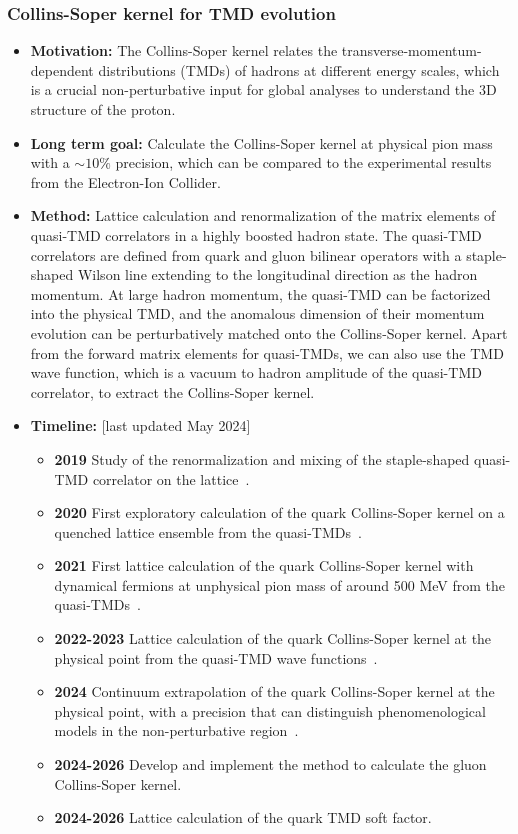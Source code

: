 \documentclass[12pt,hyperpdf]{article}
\begin{document}
\subsubsection{Collins-Soper kernel for TMD evolution}
\begin{itemize}
    \item{\bf Motivation:} The Collins-Soper kernel relates the
      transverse-momentum-dependent distributions (TMDs) of hadrons at
      different energy scales, which is a crucial non-perturbative
      input for global analyses to understand the 3D structure of the
      proton.
    \item{\bf Long term goal:} Calculate the Collins-Soper kernel at
      physical pion mass with a $\sim 10\%$ precision, which can be
      compared to the experimental results from the Electron-Ion
      Collider.
    \item{\bf Method:} Lattice calculation and renormalization of the
      matrix elements of quasi-TMD correlators in a highly boosted
      hadron state. The quasi-TMD correlators are defined from quark
      and gluon bilinear operators with a staple-shaped Wilson line
      extending to the longitudinal direction as the hadron
      momentum. At large hadron momentum, the quasi-TMD can be
      factorized into the physical TMD, and the anomalous dimension of
      their momentum evolution can be perturbatively matched onto the
      Collins-Soper kernel. Apart from the forward matrix elements for
      quasi-TMDs, we can also use the TMD wave function, which is a
      vacuum to hadron amplitude of the quasi-TMD correlator, to
      extract the Collins-Soper kernel.
\item{\bf Timeline:} \hfill [last updated May 2024]
\begin{itemize}
    \item{\bf 2019} Study of the renormalization and mixing of the
      staple-shaped quasi-TMD correlator on the
      lattice~\cite{Shanahan:2019zcq}.
    \item{\bf 2020} First exploratory calculation of the quark
      Collins-Soper kernel on a quenched lattice ensemble from the
      quasi-TMDs~\cite{Shanahan:2020zxr}.
    \item{\bf 2021} First lattice calculation of the quark Collins-Soper
      kernel with dynamical fermions at unphysical pion mass of around
      500 MeV from the quasi-TMDs~\cite{Shanahan:2021tst}.
    \item{\bf 2022-2023} Lattice calculation of the quark
      Collins-Soper kernel at the physical point from the quasi-TMD
      wave functions~\cite{Avkhadiev:2023poz}.
    \item{\bf 2024} Continuum extrapolation of the quark Collins-Soper kernel at the physical point, with a precision that can distinguish phenomenological models in the non-perturbative region~\cite{Avkhadiev:2024mgd}.
    \item{\bf 2024-2026} Develop and implement the method to calculate the gluon Collins-Soper kernel.
    \item{\bf 2024-2026} Lattice calculation of the quark TMD soft factor.
\end{itemize}
\end{itemize}
\end{document}
